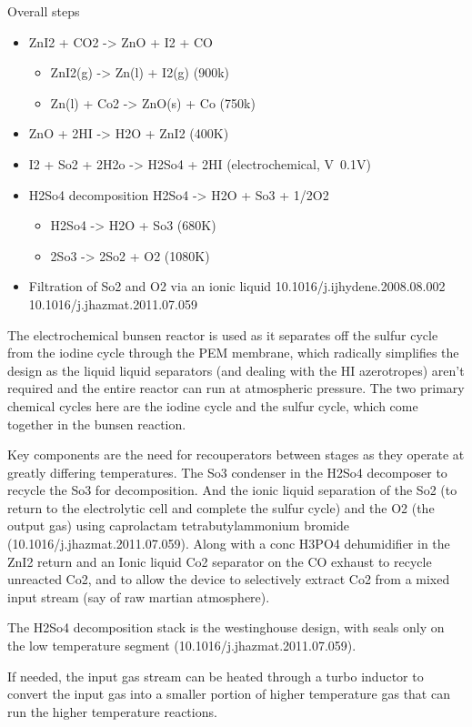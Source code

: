 \documentclass[10pt]{article}
\begin{document}
Overall steps
\begin{itemize}
    \item ZnI2 + CO2 -> ZnO + I2 + CO
    \begin{itemize}
        \item ZnI2(g) -> Zn(l) + I2(g) (900k)
        \item Zn(l) + Co2 -> ZnO(s) + Co (750k)
    \end{itemize}
    \item ZnO + 2HI -> H2O + ZnI2 (400K)
    \item I2 + So2 + 2H2o -> H2So4 + 2HI (electrochemical, V~0.1V)
    \item H2So4 decomposition H2So4 -> H2O + So3 + 1/2O2
    \begin{itemize}
        \item H2So4 -> H2O + So3 (680K)
        \item 2So3 -> 2So2 + O2 (1080K)
    \end{itemize}
    \item Filtration of So2 and O2 via an ionic liquid 10.1016/j.ijhydene.2008.08.002 10.1016/j.jhazmat.2011.07.059
\end{itemize}

The electrochemical bunsen reactor is used as it separates off the sulfur cycle from the iodine cycle through the PEM membrane, which radically simplifies the design as the liquid liquid separators (and dealing with the HI azerotropes) aren't required and the entire reactor can run at atmospheric pressure. The two primary chemical cycles here are the iodine cycle and the sulfur cycle, which come together in the bunsen reaction.

Key components are the need for recouperators between stages as they operate at greatly differing temperatures. The So3 condenser in the H2So4 decomposer to recycle the So3 for decomposition. And the ionic liquid separation of the So2 (to return to the electrolytic cell and complete the sulfur cycle) and the O2 (the output gas) using caprolactam tetrabutylammonium bromide (10.1016/j.jhazmat.2011.07.059). Along with a conc H3PO4 dehumidifier in the ZnI2 return and an Ionic liquid Co2 separator on the CO exhaust to recycle unreacted Co2, and to allow the device to selectively extract Co2 from a mixed input stream (say of raw martian atmosphere).

The H2So4 decomposition stack is the westinghouse design, with seals only on the low temperature segment (10.1016/j.jhazmat.2011.07.059).

If needed, the input gas stream can be heated through a turbo inductor to convert the input gas into a smaller portion of higher temperature gas that can run the higher temperature reactions.
\end{document}
